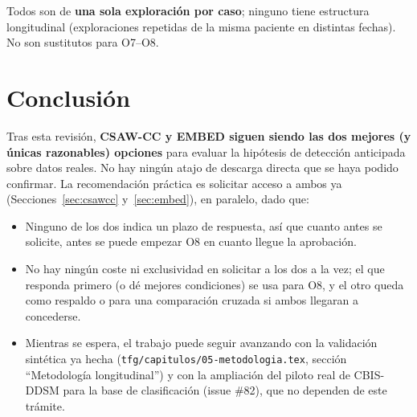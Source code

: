 \documentclass[11pt,a4paper]{article}
\begin{document}
\begin{description}[leftmargin=0cm,style=nextline]
  \item[Otros datasets de mamografía de descarga libre (INbreast, VinDr-Mammo,
        CMMD, MIAS)]
        Todos son de \textbf{una sola exploración por caso}; ninguno tiene
        estructura longitudinal (exploraciones repetidas de la misma
        paciente en distintas fechas). No son sustitutos para O7--O8.
\end{description}

\section{Conclusión}
Tras esta revisión, \textbf{CSAW-CC y EMBED siguen siendo las dos mejores
(y únicas razonables) opciones} para evaluar la hipótesis de detección
anticipada sobre datos reales. No hay ningún atajo de descarga directa que
se haya podido confirmar. La recomendación práctica es solicitar acceso a
ambos ya (Secciones~\ref{sec:csawcc} y~\ref{sec:embed}), en paralelo, dado
que:
\begin{itemize}
  \item Ninguno de los dos indica un plazo de respuesta, así que cuanto
        antes se solicite, antes se puede empezar O8 en cuanto llegue la
        aprobación.
  \item No hay ningún coste ni exclusividad en solicitar a los dos a la
        vez; el que responda primero (o dé mejores condiciones) se usa
        para O8, y el otro queda como respaldo o para una comparación
        cruzada si ambos llegaran a concederse.
  \item Mientras se espera, el trabajo puede seguir avanzando con la
        validación sintética ya hecha (\texttt{tfg/capitulos/05-metodologia.tex},
        sección ``Metodología longitudinal'') y con la ampliación del
        piloto real de CBIS-DDSM para la base de clasificación (issue
        \#82), que no dependen de este trámite.
\end{itemize}
\end{document}
